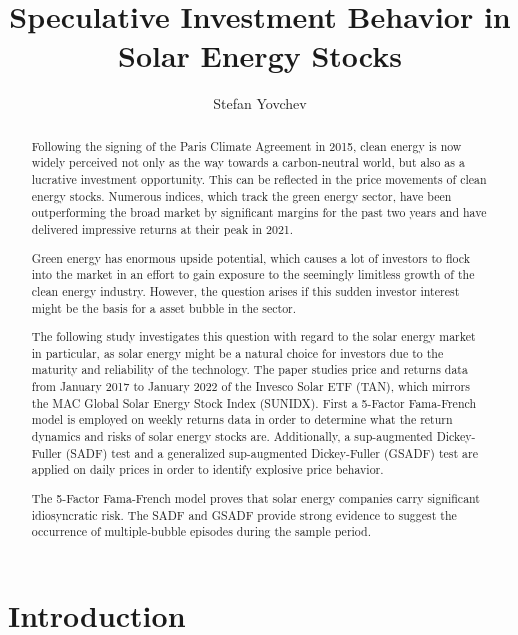 \documentclass[11pt]{article}
\title{Speculative Investment Behavior in Solar Energy Stocks}
\author{Stefan Yovchev}
\begin{document}
\maketitle

\newpage

\begin{abstract}
Following the signing of the Paris Climate Agreement in 2015, clean energy is now widely perceived not only as the way towards a carbon-neutral world, but also as a lucrative investment opportunity. This can be reflected in the price movements of clean energy stocks. Numerous indices, which track the green energy sector, have been outperforming the broad market by significant margins for the past two years and have delivered impressive returns at their peak in 2021. 
\newline

Green energy has enormous upside potential, which causes a lot of investors to flock into the market in an effort to gain exposure to the seemingly limitless growth of the clean energy industry. However, the question arises if this sudden investor interest might be the basis for a asset bubble in the sector. 
\newline

The following study investigates this question with regard to the solar energy market in particular, as solar energy might be a natural choice for investors due to the maturity and reliability of the technology. The paper studies price and returns data from January 2017 to January 2022 of the Invesco Solar ETF (TAN), which mirrors the MAC Global Solar Energy Stock Index (SUNIDX). First a 5-Factor Fama-French model is employed on weekly returns data in order to determine what the return dynamics and risks of solar energy stocks are. Additionally, a sup-augmented Dickey-Fuller (SADF) test and a generalized sup-augmented Dickey-Fuller (GSADF) test are applied on daily prices in order to identify explosive price behavior. 
\newline

The 5-Factor Fama-French model proves that solar energy companies carry significant idiosyncratic risk. The SADF and GSADF provide strong evidence to suggest the occurrence of multiple-bubble episodes during the sample period.

\end{abstract}

\newpage

\section{Introduction}
\end{document}
